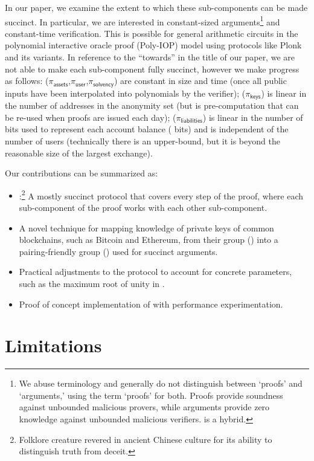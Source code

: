In our paper, we examine the extent to which these sub-components can be made succinct. In particular, we are interested in constant-sized arguments\footnote{We abuse terminology and generally do not distinguish between `proofs' and `arguments,' using the term `proofs' for both. Proofs provide soundness against unbounded malicious provers, while arguments provide zero knowledge against unbounded malicious verifiers. \Sys is a hybrid.} and constant-time verification. This is possible for general arithmetic circuits in the polynomial interactive oracle proof (Poly-IOP) model using protocols like Plonk and its variants. In reference to the ``towards'' in the title of our paper, we are not able to make each sub-component fully succinct, however we make progress as follows: ($\pi_\mathsf{assets}$,$\pi_\mathsf{user}$,$\pi_\mathsf{solvency}$) are constant in size and time (once all public inputs have been interpolated into polynomials by the verifier); ($\pi_\mathsf{keys}$) is linear in the number of addresses in the anonymity set (but is pre-computation that can be re-used when proofs are issued each day); ($\pi_\mathsf{liabilities}$) is linear in the number of bits used to represent each account balance ( bits) and is independent of the number of users (technically there is an upper-bound, but it is beyond the reasonable size of the largest exchange).

Our contributions can be summarized as:

\begin{itemize}
\item \Sys:\footnote{Folklore creature revered in ancient Chinese culture for its ability to distinguish truth from deceit.} A mostly succinct protocol that covers every step of the proof, where each sub-component of the proof works with each other sub-component.
\item A novel technique for mapping knowledge of private keys of common blockchains, such as Bitcoin and Ethereum, from their group (\secp) into a pairing-friendly group (\bls) used for succinct arguments.
\item Practical adjustments to the protocol to account for concrete parameters, such as the maximum root of unity in \bls. 
\item Proof of concept implementation of \Sys with performance experimentation.
\end{itemize}


\section{Limitations}

